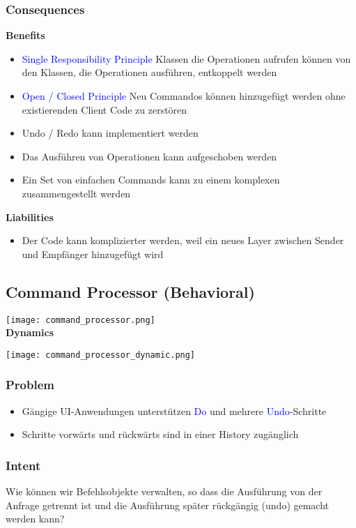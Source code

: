 \subsubsection{Consequences}
\textbf{Benefits}
\begin{itemize}
    \item \textcolor{blue}{Single Responsibility Principle} Klassen die Operationen aufrufen können von den Klassen, die Operationen ausführen, entkoppelt werden
    \item \textcolor{blue}{Open / Closed Principle} Neu Commandos können hinzugefügt werden ohne existierenden Client Code zu zerstören
    \item Undo / Redo kann implementiert werden
    \item Das Ausführen von Operationen kann aufgeschoben werden
    \item Ein Set von einfachen Commands kann zu einem komplexen zusammengestellt werden
\end{itemize}
\vspace{10pt}
\textbf{Liabilities}
\begin{itemize}
    \item Der Code kann komplizierter werden, weil ein neues Layer zwischen Sender und Empfänger
    hinzugefügt wird
\end{itemize}

\subsection{Command Processor (Behavioral)}

\texttt{[image: command\_processor.png]} \\

\textbf{Dynamics}

\texttt{[image: command\_processor\_dynamic.png]}

\subsubsection{Problem}
\begin{itemize}
    \item Gängige UI-Anwendungen unterstützen \textcolor{blue}{Do} und mehrere \textcolor{blue}{Undo}-Schritte
    \item Schritte vorwärts und rückwärts sind in einer History zugänglich
\end{itemize}

\subsubsection{Intent}
Wie können wir Befehlsobjekte verwalten, so dass die Ausführung von der Anfrage getrennt ist und die Ausführung später rückgängig (undo) gemacht werden kann?

